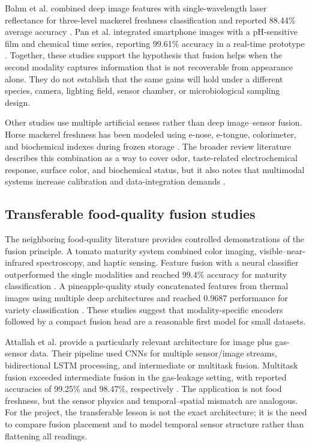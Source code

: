 \documentclass[11pt]{article}
\begin{document}
Balım et al. combined deep image features with single-wavelength laser reflectance for three-level mackerel freshness classification and reported 88.44\% average accuracy \citep{Balm2025leveraging}. Pan et al. integrated smartphone images with a pH-sensitive film and chemical time series, reporting 99.61\% accuracy in a real-time prototype \citep{Pan2025smartphone}. Together, these studies support the hypothesis that fusion helps when the second modality captures information that is not recoverable from appearance alone. They do not establish that the same gains will hold under a different species, camera, lighting field, sensor chamber, or microbiological sampling design.

Other studies use multiple artificial senses rather than deep image--sensor fusion. Horse mackerel freshness has been modeled using e-nose, e-tongue, colorimeter, and biochemical indexes during frozen storage \citep{Li2023prediction}. The broader review literature describes this combination as a way to cover odor, taste-related electrochemical response, surface color, and biochemical status, but it also notes that multimodal systems increase calibration and data-integration demands \citep{Madhubhashini2024current,Modesti2022senses}.

\subsection{Transferable food-quality fusion studies}

The neighboring food-quality literature provides controlled demonstrations of the fusion principle. A tomato maturity system combined color imaging, visible--near-infrared spectroscopy, and haptic sensing. Feature fusion with a neural classifier outperformed the single modalities and reached 99.4\% accuracy for maturity classification \citep{Liu2024development}. A pineapple-quality study concatenated features from thermal images using multiple deep architectures and reached 0.9687 performance for variety classification \citep{MohdAli2023utilisation}. These studies suggest that modality-specific encoders followed by a compact fusion head are a reasonable first model for small datasets.

Attallah et al. provide a particularly relevant architecture for image plus gas-sensor data. Their pipeline used CNNs for multiple sensor/image streams, bidirectional LSTM processing, and intermediate or multitask fusion. Multitask fusion exceeded intermediate fusion in the gas-leakage setting, with reported accuracies of 99.25\% and 98.47\%, respectively \citep{Attallah2023multitask}. The application is not food freshness, but the sensor physics and temporal--spatial mismatch are analogous. For the project, the transferable lesson is not the exact architecture; it is the need to compare fusion placement and to model temporal sensor structure rather than flattening all readings.
\end{document}
